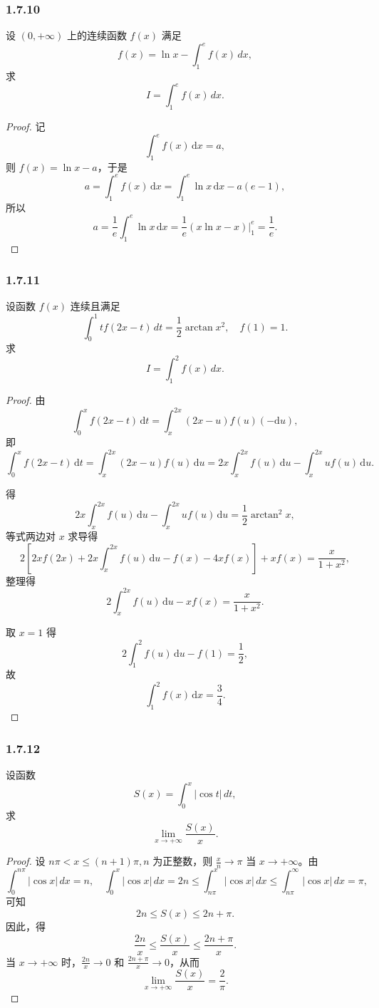 \documentclass[12pt]{ctexart}
\begin{document}
\subsubsection*{1.7.10}
设 $(0, +\infty)$ 上的连续函数 $f(x)$ 满足
\[
f(x) = \ln x - \int_1^e f(x) \, dx,
\]
求
\[
I = \int_1^e f(x) \, dx.
\]

\begin{proof}
记
\[
\int_{1}^{e} f(x) \, \mathrm{d}x = a,
\]
则 $f(x) = \ln x - a$，于是
\[
a = \int_{1}^{e} f(x) \, \mathrm{d}x = \int_{1}^{e} \ln x \, \mathrm{d}x - a (e - 1),
\]
所以
\[
a = \frac{1}{e} \int_{1}^{e} \ln x \, \mathrm{d}x = \frac{1}{e} \left( x \ln x - x \right) \Big|_{1}^{e} = \frac{1}{e}.
\]
\end{proof}



\subsubsection*{1.7.11}
设函数 $f(x)$ 连续且满足
\[
\int_0^1 t f(2x - t) \, dt = \frac{1}{2} \arctan x^2, \quad f(1) = 1.
\]
求
\[
I = \int_1^2 f(x) \, dx.
\]

\begin{proof}
	由
\[
\int_{0}^{x} f(2x - t) \, \mathrm{d}t = \int_{x}^{2x} (2x - u) f(u) (-\mathrm{d}u),
\]
即
\[
\int_{0}^{x} f(2x - t) \, \mathrm{d}t = \int_{x}^{2x} (2x - u) f(u) \, \mathrm{d}u = 2x \int_{x}^{2x} f(u) \, \mathrm{d}u - \int_{x}^{2x} u f(u) \, \mathrm{d}u.
\]

得
\[
2x \int_{x}^{2x} f(u) \, \mathrm{d}u - \int_{x}^{2x} u f(u) \, \mathrm{d}u = \frac{1}{2} \arctan^2 x,
\]
等式两边对 $x$ 求导得
\[
2 \left[ 2x f(2x) + 2x \int_{x}^{2x} f(u) \, \mathrm{d}u - f(x) - 4x f(x) \right] + x f(x) = \frac{x}{1 + x^2},
\]
整理得
\[
2 \int_{x}^{2x} f(u) \, \mathrm{d}u - x f(x) = \frac{x}{1 + x^2}.
\]

取 $x = 1$ 得
\[
2 \int_{1}^{2} f(u) \, \mathrm{d}u - f(1) = \frac{1}{2},
\]
故
\[
\int_{1}^{2} f(x) \, \mathrm{d}x = \frac{3}{4}.
\]

\end{proof}

\subsubsection*{1.7.12}
设函数
\[
S(x) = \int_0^x |\cos t| \, dt,
\]
求
\[
\lim_{x \to +\infty} \frac{S(x)}{x}.
\]

\begin{proof}
    设 $n\pi < x \leq (n+1)\pi, n$ 为正整数，则 $\frac{x}{n} \to \pi$ 当 $x \to +\infty$。由
    \[
    \int_0^{n\pi} |\cos x| \, dx = n, \quad \int_0^x |\cos x| \, dx = 2n \leq \int_{n\pi}^x |\cos x| \, dx \leq \int_{n\pi}^\infty |\cos x| \, dx = \pi,
    \]
    可知
    \[
    2n \leq S(x) \leq 2n + \pi.
    \]
    因此，得
    \[
    \frac{2n}{x} \leq \frac{S(x)}{x} \leq \frac{2n + \pi}{x}.
    \]
    当 $x \to +\infty$ 时，$\frac{2n}{x} \to 0$ 和 $\frac{2n + \pi}{x} \to 0$，从而
    \[
    \lim_{x \to +\infty} \frac{S(x)}{x} = \frac{2}{\pi}.
    \]
\end{proof}
\end{document}
